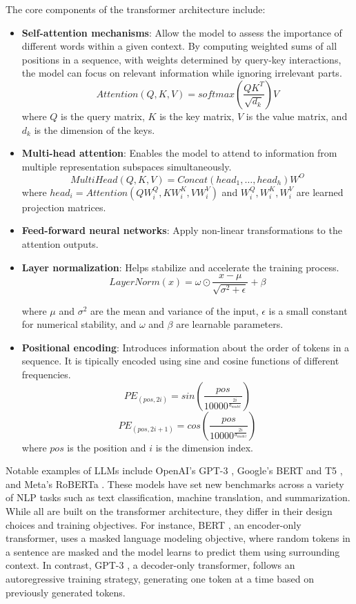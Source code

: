 The core components of the transformer architecture include:
\begin{itemize}
    \item \textbf{Self-attention mechanisms}: Allow the model to assess the importance of different words within a given context. By computing weighted sums of all positions in a sequence, with weights determined by query-key interactions, the model can focus on relevant information while ignoring irrelevant parts.
    $$Attention (Q, K, V) = softmax\left(\frac{QK^T}{\sqrt{d_k}}\right)V$$
    where \( Q \) is the query matrix, \( K \) is the key matrix, \( V \) is the value matrix, and \( d_k \) is the dimension of the keys.

    \item \textbf{Multi-head attention}: Enables the model to attend to information from multiple representation subspaces simultaneously.
    $$MultiHead(Q, K, V) = Concat(head_1, \dots, head_h)W^O$$
    where \( head_i = Attention(QW_i^Q, KW_i^K, VW_i^V) \) and \( W_i^Q, W_i^K, W_i^V \) are learned projection matrices.

    \item \textbf{Feed-forward neural networks}: Apply non-linear transformations to the attention outputs.
    \item \textbf{Layer normalization}: Helps stabilize and accelerate the training process.
    $$LayerNorm(x) = \omega \odot  \frac{x - \mu}{\sqrt{\sigma^2 + \epsilon}} + \beta$$

    where \( \mu \) and \( \sigma^2 \) are the mean and variance of the input, \( \epsilon \) is a small constant for numerical stability, and \( \omega \) and \( \beta \) are learnable parameters.
    

    \item \textbf{Positional encoding}: Introduces information about the order of tokens in a sequence. It is tipically encoded using sine and cosine functions of different frequencies.
    $$PE_{(pos, 2i)} = sin\left(\frac{pos}{10000^{\frac{2i}{d_{model}}}}\right)$$  
    $$PE_{(pos, 2i+1)} = cos\left(\frac{pos}{10000^{\frac{2i}{d_{model}}}}\right)$$
    where \( pos \) is the position and \( i \) is the dimension index.

\end{itemize}

Notable examples of LLMs include OpenAI's GPT-3 \cite{gpt3Paper}, Google's BERT \cite{bertPaper} and T5 \cite{t5GooglePaper}, and Meta's RoBERTa \cite{robertaPaper}. These models have set new benchmarks across a variety of NLP tasks such as text classification, machine translation, and summarization. While all are built on the transformer architecture, they differ in their design choices and training objectives. For instance, BERT \cite{bertPaper}, an encoder-only transformer, uses a masked language modeling objective, where random tokens in a sentence are masked and the model learns to predict them using surrounding context. In contrast, GPT-3 \cite{gpt3Paper}, a decoder-only transformer, follows an autoregressive training strategy, generating one token at a time based on previously generated tokens.

